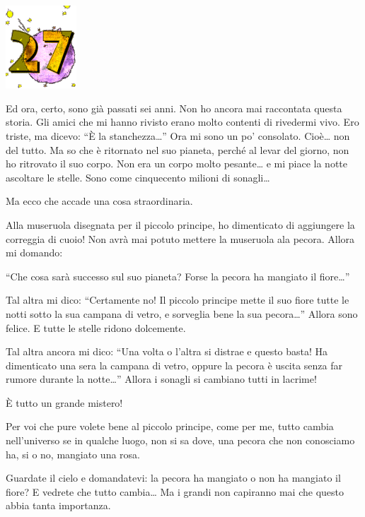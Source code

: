 \documentclass[11pt]{scrbook}
\begin{document}
\chapter{}
\begin{center}
\includegraphics{img/chapter27}
\end{center}

Ed ora, certo, sono già passati sei anni. Non ho ancora mai raccontata questa storia. Gli amici che mi hanno rivisto erano molto contenti di rivedermi vivo. Ero triste, ma dicevo: ``È la stanchezza\ldots{}'' Ora mi sono un po' consolato. Cioè\ldots{} non del tutto. Ma so che è ritornato nel suo pianeta, perché al levar del giorno, non ho ritrovato il suo corpo. Non era un corpo molto pesante\ldots{} e mi piace la notte ascoltare le stelle. Sono come cinquecento milioni di sonagli\ldots{}

Ma ecco che accade una cosa straordinaria.

Alla museruola disegnata per il piccolo principe, ho dimenticato di aggiungere la correggia di cuoio! Non avrà mai potuto mettere la museruola ala pecora. Allora mi domando:

``Che cosa sarà successo sul suo pianeta? Forse la pecora ha mangiato il fiore\ldots{}''

Tal altra mi dico: ``Certamente no! Il piccolo principe mette il suo fiore tutte le notti sotto la sua campana di vetro, e sorveglia bene la sua pecora\ldots{}'' Allora sono felice. E tutte le stelle ridono dolcemente.

Tal altra ancora mi dico: ``Una volta o l'altra si distrae e questo basta! Ha dimenticato una sera la campana di vetro, oppure la pecora è uscita senza far rumore durante la notte\ldots{}'' Allora i sonagli si cambiano tutti in lacrime!

È tutto un grande mistero!

Per voi che pure volete bene al piccolo principe, come per me, tutto cambia nell'universo se in qualche luogo, non si sa dove, una pecora che non conosciamo ha, si o no, mangiato una rosa.

Guardate il cielo e domandatevi: la pecora ha mangiato o non ha mangiato il fiore? E vedrete che tutto cambia\ldots{} Ma i grandi non capiranno mai che questo abbia tanta importanza.
\end{document}
